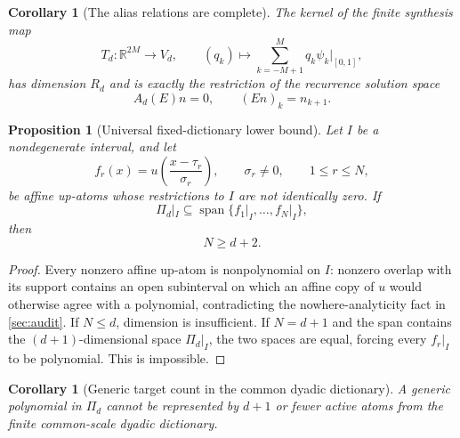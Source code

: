 \documentclass[11pt,oneside]{article}
\newtheorem{proposition}[theorem]{Proposition}
\newtheorem{corollary}[theorem]{Corollary}
\theoremstyle{definition}
\theoremstyle{remark}
\newcommand{\R}{\mathbb R}
\newcommand{\Span}{\operatorname{span}}
\begin{document}
\begin{corollary}[The alias relations are complete]
\label{cor:kernel-complete}
The kernel of the finite synthesis map
\begin{equation}
 T_d:\R^{2M}\to V_d,
 \qquad
 (q_k)\longmapsto\sum_{k=-M+1}^{M}q_k\psi_k|_{[0,1]},     \label{eq:finite-T}
\end{equation}
has dimension $R_d$ and is exactly the restriction of the recurrence solution space
\begin{equation}
 A_d(E)n=0,
 \qquad (En)_k=n_{k+1}.                                   \label{eq:A-recurrence}
\end{equation}
\end{corollary}

\begin{proposition}[Universal fixed-dictionary lower bound]
\label{prop:universal-fixed-lower}
Let $I$ be a nondegenerate interval, and let
\begin{equation}
 f_r(x)=u\!\left(\frac{x-\tau_r}{\sigma_r}\right),
 \qquad \sigma_r\ne0,
 \qquad 1\le r\le N,                                    \label{eq:arbitrary-atoms}
\end{equation}
be affine up-atoms whose restrictions to $I$ are not identically zero.  If
\begin{equation}
 \Pi_d|_I\subseteq\Span\{f_1|_I,\ldots,f_N|_I\},          \label{eq:fixed-dict-spans}
\end{equation}
then
\begin{equation}
 \boxed{N\ge d+2.}                                       \label{eq:universal-fixed-lower}
\end{equation}
\end{proposition}

\begin{proof}
Every nonzero affine up-atom is nonpolynomial on $I$: nonzero overlap with its support contains an open subinterval on which an affine copy of $u$ would otherwise agree with a polynomial, contradicting the nowhere-analyticity fact in \cref{sec:audit}.  If $N\le d$, dimension is insufficient.  If $N=d+1$ and the span contains the $(d+1)$-dimensional space $\Pi_d|_I$, the two spaces are equal, forcing every $f_r|_I$ to be polynomial.  This is impossible.
\end{proof}

\begin{corollary}[Generic target count in the common dyadic dictionary]
\label{cor:minimal-count}
A generic polynomial in $\Pi_d$ cannot be represented by $d+1$ or fewer active atoms from the finite common-scale dyadic dictionary.
\end{corollary}
\end{document}

